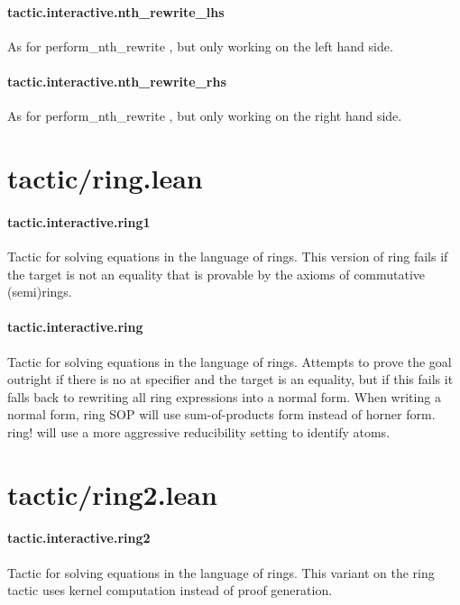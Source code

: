 \documentclass{article}
\begin{document}
\paragraph{tactic.interactive.nth\_rewrite\_lhs}
\par
As for 
\colorbox[RGB]{253,246,227}{{{{\color[RGB]{101, 123, 131} perform\_nth\_rewrite }}}}, but only working on the left hand side.
\paragraph{tactic.interactive.nth\_rewrite\_rhs}
\par
As for 
\colorbox[RGB]{253,246,227}{{{{\color[RGB]{101, 123, 131} perform\_nth\_rewrite }}}}, but only working on the right hand side.
\section{tactic/ring.lean}\paragraph{tactic.interactive.ring1}
\par
Tactic for solving equations in the language of rings.
This version of 
\colorbox[RGB]{253,246,227}{{{{\color[RGB]{101, 123, 131} ring }}}} fails if the target is not an equality
that is provable by the axioms of commutative (semi)rings.
\paragraph{tactic.interactive.ring}
\par
Tactic for solving equations in the language of rings.
Attempts to prove the goal outright if there is no 
\colorbox[RGB]{253,246,227}{{{{\color[RGB]{133, 153, 0} at }}}}specifier and the target is an equality, but if this
fails it falls back to rewriting all ring expressions
into a normal form. When writing a normal form,
\colorbox[RGB]{253,246,227}{{{{\color[RGB]{101, 123, 131} ring SOP }}}} will use sum-of-products form instead of horner form.
\colorbox[RGB]{253,246,227}{{{{\color[RGB]{101, 123, 131} ring! }}}} will use a more aggressive reducibility setting to identify atoms.
\section{tactic/ring2.lean}\paragraph{tactic.interactive.ring2}
\par
Tactic for solving equations in the language of rings.
This variant on the 
\colorbox[RGB]{253,246,227}{{{{\color[RGB]{101, 123, 131} ring }}}} tactic uses kernel computation instead
of proof generation.
\end{document}
